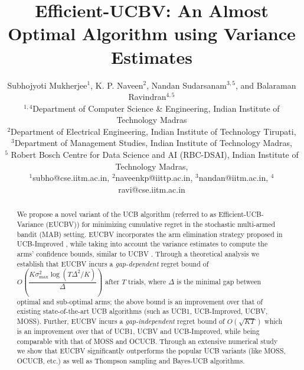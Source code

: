 \documentclass[letterpaper]{article} %
\begin{document}
%
\title{Efficient-UCBV: An Almost Optimal Algorithm using Variance Estimates}
\author{Subhojyoti Mukherjee${}^1$, K. P. Naveen${}^2$, Nandan
Sudarsanam${}^{3,5}$, and Balaraman Ravindran${}^{4,5}$\\
${}^{1,4}$Department of Computer Science \& Engineering, Indian Institute of
Technology Madras\\ ${}^2$Department of Electrical Engineering, Indian Institute of
Technology Tirupati,\\
${}^3$Department of Management Studies, Indian Institute of
Technology Madras,\\
${}^5$ Robert Bosch Centre for Data Science and AI (RBC-DSAI), Indian Institute of
Technology Madras,\\
${}^1$subho@cse.iitm.ac.in, ${}^2$naveenkp@iittp.ac.in, ${}^3$nandan@iitm.ac.in, ${}^4$ravi@cse.iitm.ac.in}


\maketitle

\begin{abstract}
We propose a novel variant of the UCB algorithm (referred to as Efficient-UCB-Variance (EUCBV)) for minimizing cumulative regret in the stochastic multi-armed bandit (MAB) setting. EUCBV incorporates the arm elimination strategy proposed in UCB-Improved \citep{auer2010ucb}, while taking into account the variance estimates to compute the arms' confidence bounds, similar to UCBV \citep{audibert2009exploration}. Through a theoretical analysis we establish that EUCBV incurs a \emph{gap-dependent} regret bound of {\scriptsize $O\left( \dfrac{K\sigma^2_{\max} \log (T\Delta^2 /K)}{\Delta}\right)$} after $T$ trials, where $\Delta$ is the minimal gap between optimal and sub-optimal arms; the above bound is an improvement over that of existing state-of-the-art UCB algorithms (such as UCB1, UCB-Improved, UCBV,  MOSS). Further, EUCBV incurs a \emph{gap-independent} regret bound of {\scriptsize $O\left(\sqrt{KT}\right)$}  which is an improvement over that of UCB1, UCBV and UCB-Improved, while being comparable with that of MOSS and OCUCB. Through an extensive numerical study we show that EUCBV significantly outperforms the popular UCB variants (like MOSS, OCUCB, etc.) as well as Thompson sampling and Bayes-UCB algorithms. 

\end{abstract}
\end{document}
